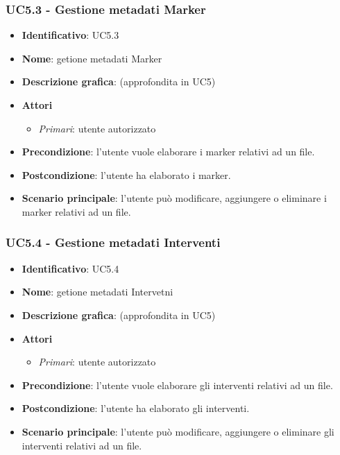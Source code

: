 \subsubsection{UC5.3 - Gestione metadati Marker}
\begin{itemize}
  \item \textbf{Identificativo}: UC5.3
  \item \textbf{Nome}: getione metadati Marker
  \item \textbf{Descrizione grafica}: (approfondita in UC5)
  \item \textbf{Attori}
        \begin{itemize}
          \item \textit{Primari}: utente autorizzato
        \end{itemize}
  \item \textbf{Precondizione}: l'utente vuole elaborare i marker relativi ad un file.
  \item \textbf{Postcondizione}: l'utente ha elaborato i marker.
  \item \textbf{Scenario principale}: l'utente può modificare, aggiungere o eliminare i marker relativi ad un file.
\end{itemize}

\subsubsection{UC5.4 - Gestione metadati Interventi}
\begin{itemize}
  \item \textbf{Identificativo}: UC5.4
  \item \textbf{Nome}: getione metadati Intervetni
  \item \textbf{Descrizione grafica}: (approfondita in UC5)
  \item \textbf{Attori}
        \begin{itemize}
          \item \textit{Primari}: utente autorizzato
        \end{itemize}
  \item \textbf{Precondizione}: l'utente vuole elaborare gli interventi relativi ad un file.
  \item \textbf{Postcondizione}: l'utente ha elaborato gli interventi.
  \item \textbf{Scenario principale}: l'utente può modificare, aggiungere o eliminare gli interventi relativi ad un file.
\end{itemize}
\newpage